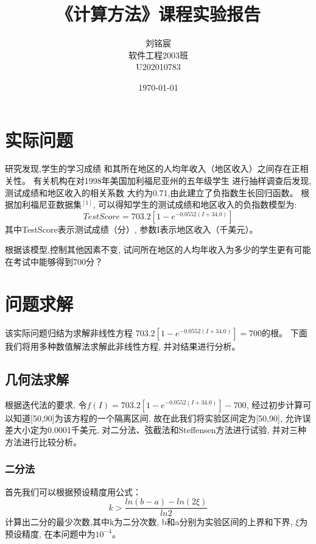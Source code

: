 \documentclass[12pt,a4paper]{article}
\title{《计算方法》课程实验报告}
\author{刘铭宸\\软件工程2003班\\U202010783}
\date{\today}
\begin{document}
\begin{titlepage}
\maketitle
\end{titlepage}

\tableofcontents

\newpage
\section{实际问题}
研究发现,学生的学习成绩
和其所在地区的人均年收入（地区收入）之间存在正相关性。
有关机构在对1998年美国加利福尼亚州的五年级学生
进行抽样调查后发现,测试成绩和地区收入的相关系数
大约为0.71,由此建立了负指数生长回归函数。
根据加利福尼亚数据集$^{[1]}$,
可以得知学生的测试成绩和地区收入的负指数模型为:
\begin{equation}
    TestScore=703.2[1-e^{-0.0552(I+34.0)}]
\end{equation}
其中TestScore表示测试成绩（分）,
参数I表示地区收入（千美元）。

根据该模型,控制其他因素不变,
试问所在地区的人均年收入为多少的学生更有可能在考试中能够得到700分？
\section{问题求解}
该实际问题归结为求解非线性方程
$703.2[1-e^{-0.0552(I+34.0)}]=700$的根。
下面我们将用多种数值解法求解此非线性方程,
并对结果进行分析。
\subsection{几何法求解}
根据迭代法的要求,
令$f(I)=703.2[1-e^{-0.0552(I+34.0)}]-700$,
经过初步计算可以知道[50,90]为该方程的一个隔离区间,
故在此我们将实验区间定为[50,90],
允许误差大小定为0.0001千美元,
对二分法、弦截法和Steffensen方法进行试验,
并对三种方法进行比较分析。
\subsubsection{二分法}
首先我们可以根据预设精度用公式：
\begin{equation}
    k>\frac{ln(b-a)-ln(2\xi)}{ln2}
\end{equation}
计算出二分的最少次数,其中k为二分次数,
b和a分别为实验区间的上界和下界,
$\xi$为预设精度,
在本问题中为$10^{-4}$。
\end{document}
